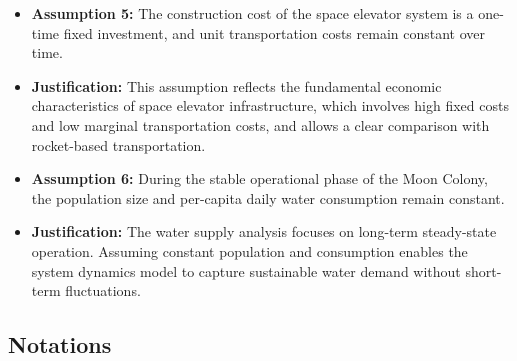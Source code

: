 \documentclass[12pt]{mcmthesis}
\begin{document}
\begin{itemize}
    \item \textbf{Assumption 5:}
          The construction cost of the space elevator system is a one-time fixed investment, and unit transportation costs remain constant over time.

    \item \textbf{Justification:}
          This assumption reflects the fundamental economic characteristics of space elevator infrastructure, which involves high fixed costs and low marginal transportation costs, and allows a clear comparison with rocket-based transportation.

    \item \textbf{Assumption 6:}
          During the stable operational phase of the Moon Colony, the population size and per-capita daily water consumption remain constant.

    \item \textbf{Justification:}
          The water supply analysis focuses on long-term steady-state operation. Assuming constant population and consumption enables the system dynamics model to capture sustainable water demand without short-term fluctuations.

\end{itemize}

\subsection{Notations}
\begingroup
\small
\renewcommand{\arraystretch}{1.1}
\setlength{\tabcolsep}{6pt}
\end{document}
